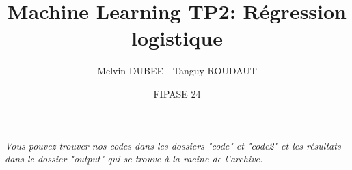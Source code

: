\documentclass{styles/articleEnsta}
\title{Machine Learning TP2: Régression logistique}
\author{Melvin DUBEE - Tanguy ROUDAUT \and FIPASE 24}
\begin{document}
\maketitle

\textit{Vous pouvez trouver nos codes dans les dossiers "code" et "code2" et les résultats dans le dossier "output" qui se trouve à la racine de l'archive.}




\end{document}
